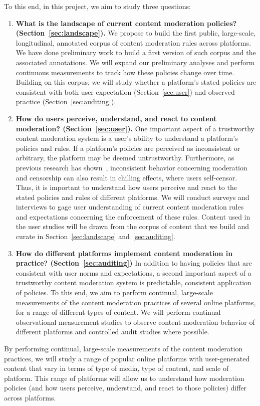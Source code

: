 To this end, in this project, we aim to study three questions: 
\begin{enumerate}
\item {\bf What is the landscape of current content moderation policies?
        (Section~\ref{sec:landscape}).} We propose to build the first
        public, large-scale, longitudinal, annotated corpus of content moderation
        rules across platforms. 
        We have done preliminary work to build a first version of such corpus and the associated annotations.
        We will expand our preliminary analyses and perform continuous measurements to track
        how these policies change over time. 
        Building on this corpus, we will study whether a platform's stated policies are consistent with both user
        expectation (Section~\ref{sec:user}) and observed practice
        (Section~\ref{sec:auditing}).
    \item {\bf How do users perceive, understand, and react to content
        moderation? (Section~\ref{sec:user}).} One important aspect of a
        trustworthy content moderation system is a user's ability to
        understand a platform's policies and rules. If a platform's policies
        are perceived as inconsistent or arbitrary, the platform may be deemed
        untrustworthy. Furthermore, as previous research has shown~\cite{fiesler_understanding_2015},
        inconsistent behavior concerning moderation and censorship can also
        result in chilling effects, where users self-censor. Thus, it is
        important to understand how users perceive and react to the stated
        policies and rules of different platforms. We will conduct surveys and interviews to gage user understanding of current content
        moderation rules and expectations concerning the enforcement of
        these rules. Content used in the user studies will be drawn
        from the corpus of content that we build and curate in
        Section~\ref{sec:landscape} and~\ref{sec:auditing}.
    \item {\bf How do different platforms implement content moderation in
        practice? (Section~\ref{sec:auditing})} In addition to having policies
        that are consistent with user norms and expectations, a second important aspect of a
        trustworthy content moderation system is predictable, consistent
        application of policies. To this end, we aim to perform continual,
        large-scale measurements of the content moderation practices of
        several online platforms, for a range of different types
        of content. We will perform 
        continual observational measurement studies to observe content moderation behavior
        of different platforms and controlled audit studies where possible.
\end{enumerate}
\noindent
By performing continual, large-scale measurements of the content
moderation practices, we will study a range of popular online
platforms with user-generated content that vary in terms of type of
media, type of content, and scale of platform. This range of platforms
will allow us to understand how moderation policies (and how users perceive,
understand, and react to those policies) differ across platforms. 
